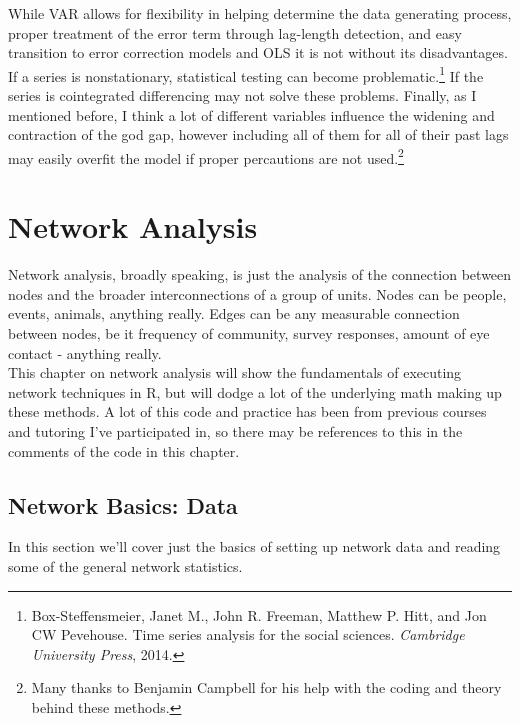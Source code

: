 \documentclass[12pt]{article}\usepackage[]{graphicx}\usepackage[]{color}
\begin{document}
\begin{flushleft}
While VAR allows for flexibility in helping determine the data generating process, proper treatment of the error term through lag-length detection, and easy transition to error correction models and OLS it is not without its disadvantages. If a series is nonstationary, statistical testing can become problematic.\footnote{Box-Steffensmeier, Janet M., John R. Freeman, Matthew P. Hitt, and Jon CW Pevehouse. Time series analysis for the social sciences. \textit{Cambridge University Press}, 2014.} If the series is cointegrated differencing may not solve these problems. Finally, as I mentioned before, I think a lot of different variables influence the widening and contraction of the god gap, however including all of them for all of their past lags may easily overfit the model if proper percautions are not used.\footnote{Many thanks to Benjamin Campbell for his help with the coding and theory behind these methods.}



\clearpage
\section{Network Analysis}

Network analysis, broadly speaking, is just the analysis of the connection between nodes and the broader interconnections of a group of units. Nodes can be people, events, animals, anything really. Edges can be any measurable connection between nodes, be it frequency of community, survey responses, amount of eye contact - anything really.\\

This chapter on network analysis will show the fundamentals of executing network techniques in R, but will dodge a lot of the underlying math making up these methods. A lot of this code and practice has been from previous courses and tutoring I've participated in, so there may be references to this in the comments of the code in this chapter. \\

\subsection{Network Basics: Data}

In this section we'll cover just the basics of setting up network data and reading some of the general network statistics.


\end{flushleft}
\end{document}

